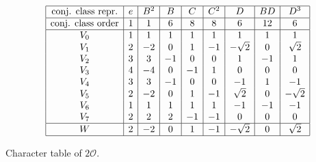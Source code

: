             \begin{table}[H]
                \centering
                {\small
                \begin{equation*}
                        \begin{array}{|c|c|c|c|c|c|c|c|c|}
                            \hline
                            \text{conj. class repr.} & e & B^2 & B & C & C^2 & D & BD & D^3 \\ \hline
                            \text{conj. class order} & 1 & 1 & 6 & 8 & 8 & 6 & 12 & 6\\
                            \hline
                            V_0 & 1 & 1 & 1 & 1 & 1 & 1 & 1 & 1 \\
                            V_1 & 2 & -2 & 0 & 1 & -1 & -\sqrt{2} & 0 & \sqrt{2} \\
                            V_2 & 3 & 3 & -1 & 0 & 0 & 1 & -1 & 1 \\
                            V_3 & 4 & -4 & 0 & -1 & 1 & 0 & 0 & 0 \\
                            V_4 & 3 & 3 & -1 & 0 & 0 & -1 & 1 & -1 \\
                            V_5 & 2 & -2 & 0 & 1 & -1 & \sqrt{2} & 0 & -\sqrt{2} \\
                            V_6 & 1 & 1 & 1 & 1 & 1 & -1 & -1 & -1 \\
                            V_7 & 2 & 2 & 2 & -1 & -1 & 0 & 0 & 0 \\ \hline
                            W & 2 & -2 & 0 & 1 & -1 & -\sqrt{2} & 0 & \sqrt{2} \\ \hline
                        \end{array}
                    \end{equation*}}
                \caption{Character table of $2\mathcal{O}$.}
            \end{table}

